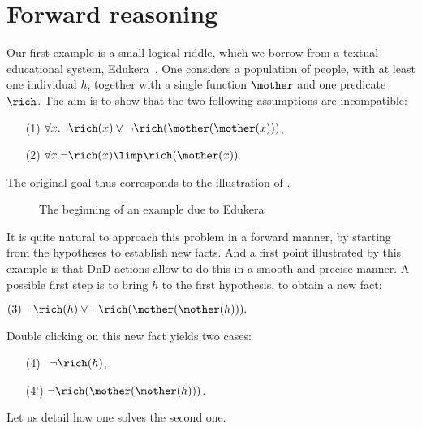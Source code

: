 \section{Forward reasoning}


Our first example is a small logical riddle, which we borrow from a textual
educational system, Edukera~. One considers a population of
people, with at least one individual $h$, together with a single function
$\mother$ and one predicate $\rich$. The aim is to show that the two following
assumptions are incompatible:
\begin{itemize}
\item[(1)] $\forall x. \neg\rich(x)\lor \neg\rich(\mother(\mother(x)))$,
\item[(2)] $\forall x. \neg\rich(x) \limp \rich(\mother(x)).$
\end{itemize}
The original goal thus corresponds to the illustration of .

\begin{figure*}
  \caption{The beginning of an example due to Edukera}
\end{figure*}

It is quite natural to approach this problem in a forward manner, by starting
from the hypotheses to establish new facts. And a first point illustrated by
this example is that DnD actions allow to do this in a smooth and precise
manner. A possible first step is to bring $h$ to the first hypothesis, to obtain
a new fact:

\medskip
$(3) ~\neg\rich(h)\lor \neg\rich(\mother(\mother(h))).$
\medskip

\noindent Double clicking on this new fact yields two cases:
\begin{itemize}
 \item[(4)~] $ \neg\rich(h)$,
 \item[(4')] $ \neg\rich(\mother(\mother(h)))$.
 \end{itemize}
Let us detail how one solves the
second one.

